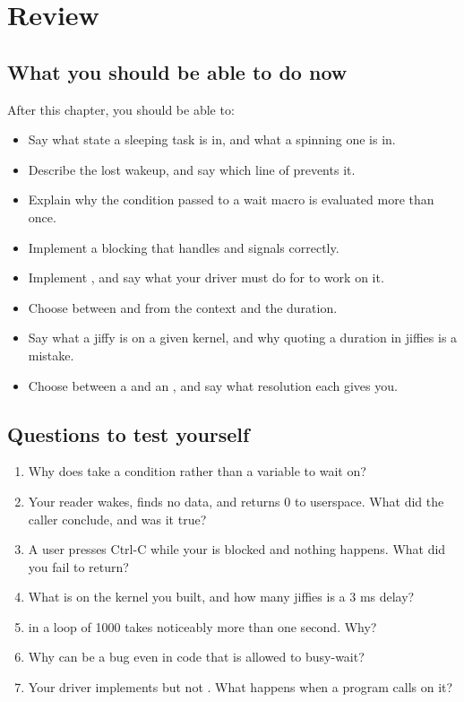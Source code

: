 
\section{Review}
\label{c9:sec:review}

\subsection*{What you should be able to do now}
After this chapter, you should be able to:
\begin{itemize}
  \item Say what state a sleeping task is in, and what a spinning one is in.
  \item Describe the lost wakeup, and say which line of  prevents it.
  \item Explain why the condition passed to a wait macro is evaluated more than once.
  \item Implement a blocking  that handles  and signals correctly.
  \item Implement , and say what your driver must do for  to work on it.
  \item Choose between  and  from the context and the duration.
  \item Say what a jiffy is on a given kernel, and why quoting a duration in jiffies is a mistake.
  \item Choose between a  and an , and say what resolution each gives
    you.
\end{itemize}

\subsection*{Questions to test yourself}
\begin{enumerate}
  \item Why does  take a condition rather than a variable to wait on?
  \item Your reader wakes, finds no data, and returns 0 to userspace. What did the caller conclude,
    and was it true?
  \item A user presses Ctrl-C while your  is blocked and nothing happens. What did you
    fail to return?
  \item What is  on the kernel you built, and how many jiffies is a 3 ms delay?
  \item {} in a loop of 1000 takes noticeably more than one second. Why?
  \item Why can  be a bug even in code that is allowed to busy-wait?
  \item Your driver implements  but not . What happens when a program calls
     on it?
\end{enumerate}

